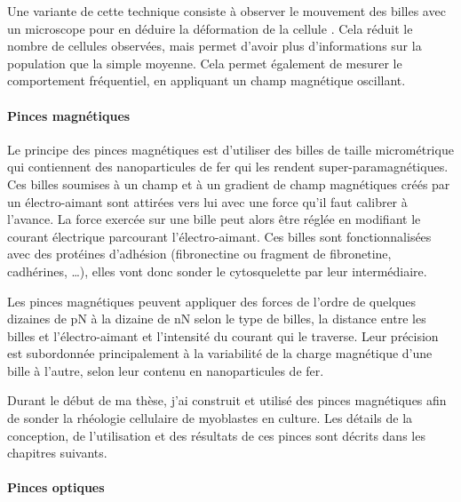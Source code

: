 Une variante de cette technique consiste à observer le mouvement des billes avec un microscope pour en déduire la déformation de la cellule \parencite{fabry_scaling_2001}. Cela réduit le nombre de cellules observées, mais permet d'avoir plus d'informations sur la population que la simple moyenne. Cela permet également de mesurer le comportement fréquentiel, en appliquant un champ magnétique oscillant. 






\paragraph{Pinces magnétiques}

Le principe des pinces magnétiques est d'utiliser des billes de taille micrométrique qui contiennent des nanoparticules de fer qui les rendent super-paramagnétiques.
Ces billes soumises à un champ et à un gradient de champ magnétiques créés par un électro-aimant sont attirées vers lui avec une force qu'il faut calibrer à l'avance.
La force exercée sur une bille peut alors être réglée en modifiant le courant électrique parcourant l'électro-aimant.
Ces billes sont fonctionnalisées avec des protéines d'adhésion (fibronectine ou fragment de fibronetine, cadhérines, \dots), elles vont donc sonder le cytosquelette par leur intermédiaire. 


Les pinces magnétiques peuvent appliquer des forces de l'ordre de quelques dizaines de pN à la dizaine de nN selon le type de billes, la distance entre les billes et l’électro-aimant et l’intensité du courant qui le traverse. 
Leur précision est subordonnée principalement à la variabilité de la charge magnétique d'une bille à l'autre, selon leur contenu en nanoparticules de fer. 


Durant le début de ma thèse, j'ai construit et utilisé des pinces magnétiques afin de sonder la rhéologie cellulaire de myoblastes en culture. Les détails de la conception, de l'utilisation et des résultats de ces pinces sont décrits dans les chapitres suivants. 


\paragraph{Pinces optiques}

